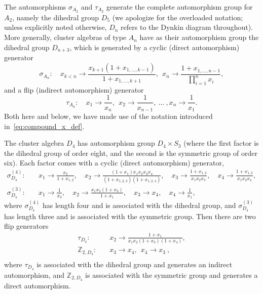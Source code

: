 \documentclass[11pt]{article}
\begin{document}
The automorphisms $\sigma_{A_2}$ and $\tau_{A_2}$ generate the complete automorphism group for $A_2$, namely the dihedral group $D_5$ (we apologize for the overloaded notation; unless explicitly noted otherwise, $D_n$ refers to the Dynkin diagram throughout). More generally, cluster algebras of type $A_n$ have as their automorphism group the dihedral group $D_{n+3}$, which is generated by a cyclic (direct automorphism) generator 
\begin{equation}
  \sigma_{A_n}:\quad x_{k<n} \to \frac{x_{k+1}(1+x_{1,\ldots,k-1})}{1+x_{1,\ldots,k+1}},~~x_n\to\frac{1+x_{1,\ldots,n-1}}{\prod_{i=1}^n x_i} ,
\end{equation}
and a flip (indirect automorphism) generator
\begin{equation}
  \tau_{A_n}: \quad x_1 \to \frac{1}{x_n},~~x_2 \to \frac{1}{x_{n-1}},~\ldots~,x_n\to\frac{1}{x_1}.
\end{equation}
Both here and below, we have made use of the notation introduced in~\eqref{eq:compound_x_def}.

The cluster algebra $D_4$ has automorphism group $D_4\times S_3$ (where the first factor is the dihedral group of order eight, and the second is the symmetric group of order six). Each factor comes with a cyclic (direct automorphism) generator,
\vspace{.1cm}
\begin{align}
  \sigma^{(4)}_{D_4}:\quad& 
    x_1\to\frac{x_2}{1+x_{1,2}}, \quad
    x_2\to\frac{\left(1+x_1\right)x_1 x_2 x_3 x_4}{\left(1+x_{1,2,3}\right) \left(1+x_{1,2,4}\right)}, \quad
    x_3\to\frac{1+x_{1,2}}{x_1 x_2 x_3}, \quad
    x_4\to\frac{1+x_{1,2}}{x_1 x_2 x_4},\nonumber \\[2ex]
  \sigma^{(3)}_{D_4}:\quad& 
    x_1\to \frac{1}{x_3}, \quad
    x_2\to \frac{x_1 x_2 \left(1+x_3\right)}{1+x_1}, \quad
    x_3\to x_4, \quad
    x_4\to \frac{1}{x_1} ,
\end{align}
where $\sigma^{(4)}_{D_4}$ has length four and is associated with the dihedral group, and $\sigma^{(3)}_{D_4}$ has length three and is associated with the symmetric group. Then there are two flip generators
\vspace{.1cm}
\begin{equation}
\begin{split}
  \tau_{D_4}:\quad& 
    x_2\to \frac{1+x_1}{x_1 x_2 \left(1+x_3\right) \left(1+x_4\right)}, \\[2ex]
  \mathbb{Z}_{2,D_4}:\quad& 
    x_3\to x_4,~~
    x_4\to x_3 \ , \\[1ex]
\end{split}  
\end{equation}
where $\tau_{D_4}$ is associated with the dihedral group and generates an indirect automorphism, and $\mathbb{Z}_{2,D_4}$ is associated with the symmetric group and generates a direct automorphism.
\end{document}
